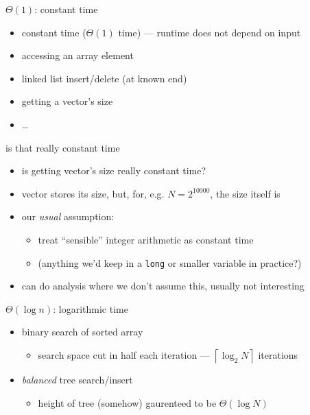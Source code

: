 \begin{frame}{$\Theta(1)$: constant time}
    \begin{itemize}
    \item constant time ($\Theta(1)$ time) --- runtime does not depend on input
    \vspace{.5cm}
    \item accessing an array element
    \item linked list insert/delete (at known end)
    \item getting a vector's size
    \item \ldots
    \end{itemize}
\end{frame}

\begin{frame}{is that really constant time}
    \begin{itemize}
    \item is getting vector's size really constant time?
    \item vector stores its size, but, for, e.g. $N=2^{10000}$, the size itself is 
    \item our \textit{usual} assumption:
        \begin{itemize}
        \item treat ``sensible'' integer arithmetic as constant time
        \item (anything we'd keep in a {\tt long} or smaller variable in practice?)
        \end{itemize}
    \item can do analysis where we don't assume this, usually not interesting
    \end{itemize}
\end{frame}

\begin{frame}{$\Theta(\log n)$: logarithmic time}
    \begin{itemize}
    \item binary search of sorted array
        \begin{itemize}
        \item search space cut in half each iteration --- $\left\lceil\log_2 N\right\rceil$ iterations
        \end{itemize}
    \item \textit{balanced} tree search/insert
        \begin{itemize}
        \item height of tree (somehow) gaurenteed to be $\Theta(\log N)$
        \end{itemize}
    \end{itemize}
\end{frame}

